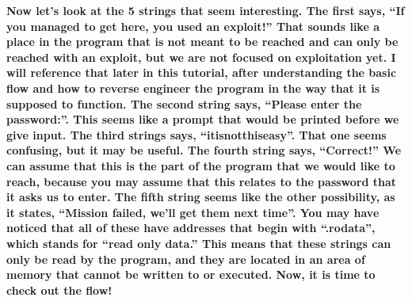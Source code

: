 \textbf{Now let's look at the 5 strings that seem interesting. The first says, ``If you managed to get here, you used an
exploit!'' That sounds like a place in the program that is not meant to be reached and can only be reached with an
exploit, but we are not focused on exploitation yet. I will reference that later in this tutorial, after understanding
the basic flow and how to reverse engineer the program in the way that it is supposed to function. The second string
says, ``Please enter the password:''. This seems like a prompt that would be printed before we give input. The third
strings says, ``itisnotthiseasy''. That one seems confusing, but it may be useful. The fourth string says, ``Correct!''
We can assume that this is the part of the program that we would like to reach, because you may assume that this
relates to the password that it asks us to enter. The fifth string seems like the other possibility, as it states,
``Mission failed, we'll get them next time''. You may have noticed that all of these have addresses that begin with
``.rodata'', which stands for ``read only data.'' This means that these strings can only be read by the program, and
they are located in an area of memory that cannot be written to or executed. Now, it is time to check out the flow!}

